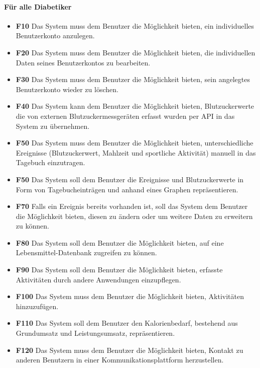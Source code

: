 	\paragraph{Für alle Diabetiker}\mbox{}
	\begin{itemize}
		\item\textbf{\lbrack F10\rbrack} Das System muss dem Benutzer die Möglichkeit bieten, ein individuelles Benutzerkonto anzulegen.
		\item\textbf{\lbrack F20\rbrack}  Das System muss dem Benutzer die Möglichkeit bieten, die individuellen Daten seines Benutzerkontos zu bearbeiten.
		\item\textbf{\lbrack F30\rbrack} Das System muss dem Benutzer die Möglichkeit bieten, sein angelegtes Benutzerkonto wieder zu löschen.
		\item\textbf{\lbrack F40\rbrack}	Das System kann dem Benutzer die Möglichkeit bieten, Blutzuckerwerte die von externen Blutzuckermessgeräten erfasst wurden per API in das System zu übernehmen.
		\item\textbf{\lbrack F50\rbrack}	Das System muss dem Benutzer die Möglichkeit bieten, unterschiedliche Ereignisse (Blutzuckerwert, Mahlzeit und sportliche Aktivität) manuell in das Tagebuch einzutragen.
		\item\textbf{\lbrack F50\rbrack} Das System soll dem Benutzer die Ereignisse und Blutzuckerwerte in Form von Tagebucheinträgen und anhand eines Graphen repräsentieren.
		\item\textbf{\lbrack F70\rbrack} Falls ein Ereignis bereits vorhanden ist, soll das System dem Benutzer die Möglichkeit bieten, diesen zu ändern oder um weitere Daten zu erweitern zu können.
		\item\textbf{\lbrack F80\rbrack} Das System soll dem Benutzer die Möglichkeit bieten, auf eine Lebensmittel-Datenbank zugreifen zu können.
		\item\textbf{\lbrack F90\rbrack} Das System soll dem Benutzer die Möglichkeit bieten, erfasste Aktivitäten durch andere Anwendungen einzupflegen.
		\item\textbf{\lbrack F100\rbrack} Das System muss dem Benutzer die Möglichkeit bieten, Aktivitäten hinzuzufügen.
		\item\textbf{\lbrack F110\rbrack} Das System soll dem Benutzer den Kalorienbedarf, bestehend aus Grundumsatz und Leistungsumsatz, repräsentieren.
		\item\textbf{\lbrack F120\rbrack} Das System muss dem Benutzer die Möglichkeit bieten, Kontakt zu anderen Benutzern in einer Kommunikationsplattform herzustellen.

\end{itemize}
